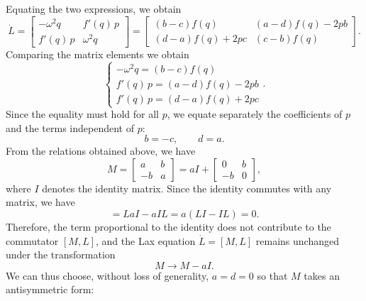 Equating the two expressions, we obtain
\begin{equation}
    \dot L =
    \begin{bmatrix}
       -\omega^2 q & f'(q)\,p \\
        f'(q)\,p & \omega^2 q
    \end{bmatrix}
    = 
    \begin{bmatrix}
        (b - c) f(q) & (a - d) f(q) - 2pb \\
        (d - a) f(q) + 2pc & (c - b) f(q)
    \end{bmatrix}.
\end{equation}
Comparing the matrix elements we obtain
\begin{equation}\label{eq:system_lax_pari_ex}
    \begin{cases}
        - \omega^2 q = (b - c) f(q) \\
        f'(q) \, p = (a - d) f(q) - 2pb \\
        f'(q) \, p = (d - a) f(q) + 2pc
    \end{cases}.
\end{equation}
Since the equality must hold for all $p$, we equate separately the coefficients of $p$ and the terms independent of $p$:
\begin{equation}
    b = - c, \qquad d = a.
\end{equation}
From the relations obtained above, we have
\begin{equation}
    M = 
    \begin{bmatrix}
        a & b \\
        -b & a
    \end{bmatrix}
        = 
        a I + 
    \begin{bmatrix}
        0 & b \\
        -b & 0
    \end{bmatrix},
\end{equation}
where $ I $ denotes the identity matrix.
Since the identity commutes with any matrix, we have
\begin{equation}
    [L, aI] = LaI - aIL = a(LI - IL) = 0.
\end{equation}
Therefore, the term proportional to the identity does not contribute to the commutator $[M,L]$, and the Lax equation $\dot L = [M,L]$ remains unchanged under the transformation
\begin{equation}
    M \longrightarrow M - a I.
\end{equation}
We can thus choose, without loss of generality, $a = d = 0$ so that $M$ takes an antisymmetric form:
